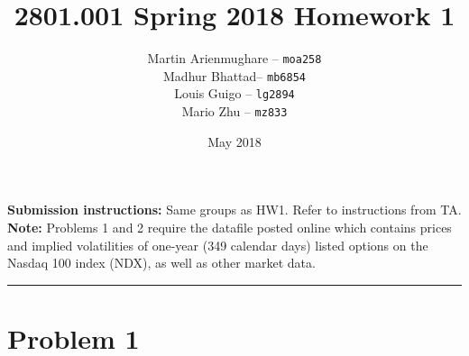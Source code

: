 \documentclass[12pt]{article}
\title{\vspace{-3cm}2801.001 Spring 2018 Homework 1 }
\author{Martin Arienmughare -- \texttt{moa258}\\
		Madhur Bhattad-- \texttt{mb6854}\\
		Louis Guigo -- \texttt{lg2894}\\
		Mario Zhu -- \texttt{mz833}}
\date{May 2018}
\begin{document}
\maketitle

\textbf{Submission instructions:} Same groups as HW1. Refer to instructions from TA.
\\

\textbf{Note:} Problems 1 and 2 require the datafile posted online which contains prices and implied volatilities of one-year (349 calendar days) listed options on the Nasdaq 100 index (NDX), as well as other market data.

\noindent
\rule{\linewidth}{0.4pt}

\section*{Problem 1}
\end{document}
